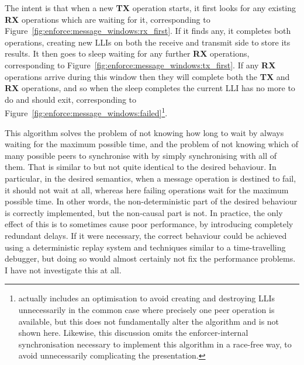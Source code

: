 The intent is that when a new \textbf{TX} operation starts, it first
looks for any existing \textbf{RX} operations which are waiting for
it, corresponding to
Figure~\ref{fig:enforce:message_windows:rx_first}.  If it finds any,
it completes both operations, creating new LLIs on both the receive
and transmit side to store its results.  It then goes to sleep waiting
for any further \textbf{RX} operations, corresponding to
Figure~\ref{fig:enforce:message_windows:tx_first}.  If any \textbf{RX}
operations arrive during this window then they will complete both the
\textbf{TX} and \textbf{RX} operations, and so when the sleep
completes the current LLI has no more to do and should exit,
corresponding to
Figure~\ref{fig:enforce:message_windows:failed}\footnote{{\Implementation}
  actually includes an optimisation to avoid creating and destroying
  LLIs unnecessarily in the common case where precisely one peer
  operation is available, but this does not fundamentally alter the
  algorithm and is not shown here.  Likewise, this discussion omits
  the enforcer-internal synchronisation necessary to implement this
  algorithm in a race-free way, to avoid unnecessarily complicating
  the presentation.}.

This algorithm solves the problem of not knowing how long to wait by
always waiting for the maximum possible time, and the problem of not
knowing which of many possible peers to synchronise with by simply
synchronising with all of them.  That is similar to but not quite
identical to the desired behaviour.  In particular, in the desired
semantics, when a message operation is destined to fail, it should not
wait at all, whereas here failing operations wait for the maximum
possible time.  In other words, the non-deterministic part of the
desired behaviour is correctly implemented, but the non-causal part is
not.  In practice, the only effect of this is to sometimes cause poor
performance, by introducing completely redundant delays.  If it were
necessary, the correct behaviour could be achieved using a
deterministic replay system\cite{Choi1998} and techniques similar to a
time-travelling debugger\cite{Xu2003}, but doing so would almost
certainly not fix the performance problems.  I have not investigate
this at all.

